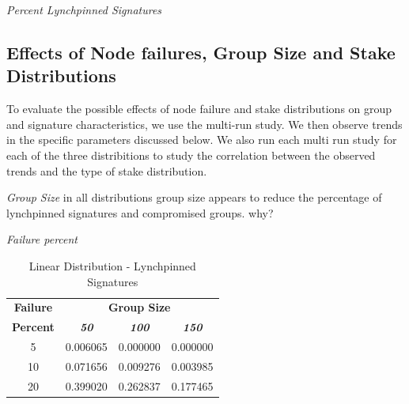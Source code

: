 \documentclass[conference]{IEEEtran}
\begin{document}
\textit{Percent Lynchpinned Signatures}

\subsection{Effects of Node failures, Group Size and Stake Distributions}
To evaluate the possible effects of node failure and stake distributions on group and signature 
characteristics, we use the multi-run study. We then observe trends in the specific parameters 
discussed below. We also run each multi run study for each of the three distribitions to study 
the correlation between the observed trends and the type of stake distribution.

\textit{Group Size} in all distributions group size appears to reduce the percentage
of lynchpinned signatures and compromised groups. why?

\textit{Failure percent}



        \begin{table}[h!]
            \caption{Linear Distribution - Lynchpinned Signatures}
            \begin{center}
            \begin{tabular}{|c|c|c|c|}
            \hline
            \textbf{Failure}&\multicolumn{3}{|c|}{\textbf{Group Size}} \\
            \cline{2-4} 
            \textbf{Percent} & \textbf{\textit{50}}& \textbf{\textit{100}}& \textbf{\textit{150}} \\
            \hline
            5 &  0.006065 &  0.000000 &  0.000000 \\
            \hline
            10 &  0.071656 &  0.009276 &  0.003985 \\
            \hline
            20 &  0.399020 &  0.262837 &  0.177465 \\
            \hline
            \end{tabular}
            \label{lynchpinned_table1}
            \end{center}
        \end{table}
\end{document}
